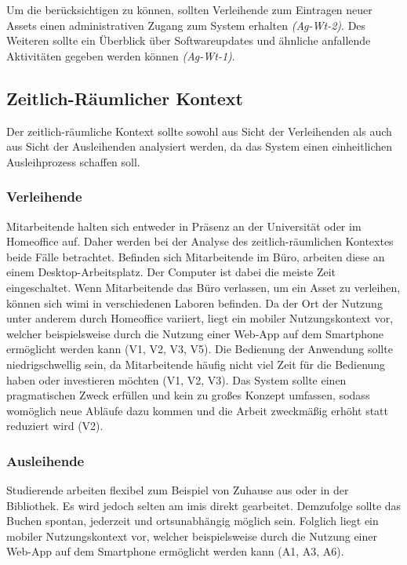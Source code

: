 Um die  berücksichtigen zu können, sollten Verleihende zum Eintragen neuer
Assets einen administrativen Zugang zum System erhalten \textit{(Ag-Wt-2)}. Des Weiteren sollte ein
Überblick über Softwareupdates und ähnliche anfallende Aktivitäten gegeben werden können
\textit{(Ag-Wt-1)}.


\subsection{Zeitlich-Räumlicher Kontext}
\label{section:zeit}
Der zeitlich-räumliche Kontext sollte sowohl aus Sicht der Verleihenden als auch
aus Sicht der Ausleihenden analysiert werden, da das System einen einheitlichen
Ausleihprozess schaffen soll.

\subsubsection{Verleihende}
Mitarbeitende halten sich entweder in Präsenz an der Universität oder im Homeoffice auf. Daher
werden bei der Analyse des zeitlich-räumlichen Kontextes beide Fälle betrachtet. Befinden sich
Mitarbeitende im Büro, arbeiten diese an einem Desktop-Arbeitsplatz. Der Computer ist dabei die
meiste Zeit eingeschaltet. Wenn Mitarbeitende das Büro verlassen, um ein Asset zu verleihen, können
sich \ac{wimi} in verschiedenen Laboren befinden. Da der Ort der Nutzung unter anderem durch
Homeoffice variiert, liegt ein mobiler Nutzungskontext vor, welcher beispielsweise durch die Nutzung
einer Web-App auf dem Smartphone ermöglicht werden kann (V1, V2, V3, V5). Die Bedienung der
Anwendung sollte niedrigschwellig sein, da Mitarbeitende häufig nicht viel Zeit für die Bedienung
haben oder investieren möchten (V1, V2, V3). Das System sollte einen pragmatischen Zweck erfüllen
und kein zu großes Konzept umfassen, sodass womöglich neue Abläufe dazu kommen und die Arbeit
zweckmäßig erhöht statt reduziert wird (V2).

\subsubsection{Ausleihende}
Studierende arbeiten flexibel zum Beispiel von Zuhause aus oder in der
Bibliothek. Es wird jedoch selten am \ac{imis} direkt gearbeitet. Demzufolge
sollte das Buchen spontan, jederzeit und ortsunabhängig möglich sein. Folglich
liegt ein mobiler Nutzungskontext vor, welcher beispielsweise durch die Nutzung
einer Web-App auf dem Smartphone ermöglicht werden kann (A1, A3, A6).


